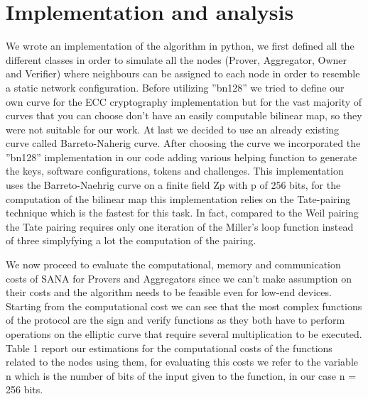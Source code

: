 \documentclass[10pt, a4paper, twocolumn]{article} %
\begin{document}
\section{Implementation and analysis}

We wrote an implementation of the algorithm in python, we first defined all the different classes in order to simulate all the nodes (Prover, Aggregator, Owner and Verifier) where neighbours can be assigned to each node in order to resemble a static network configuration.
Before utilizing ''bn128'' we tried to define our own curve for the ECC cryptography implementation but for the vast majority of curves that you can choose don't have an easily computable bilinear map, so they were not suitable for our work. At last we decided to use an already existing curve called Barreto-Naherig curve.
After choosing the curve we incorporated the ''bn128'' implementation in our code adding various helping function to generate the keys, software configurations, tokens and challenges.
This implementation uses the Barreto-Naehrig curve on a finite field Zp with p of 256 bits, for the computation of the bilinear map this implementation relies on the Tate-pairing technique which is the fastest for this task. In fact, compared to the Weil pairing the Tate pairing requires only one iteration of the Miller's loop function instead of three simplyfying a lot the computation of the pairing.

We now proceed to evaluate the computational, memory and communication costs of SANA for Provers and Aggregators since we can't make assumption on their costs and the algorithm needs to be feasible even for low-end devices.
Starting from the computational cost we can see that the most complex functions of the protocol are the sign and verify functions as they both have to perform operations on the elliptic curve that require several multiplication to be executed.
Table 1 report our estimations for the computational costs of the functions related to the nodes using them, for evaluating this costs we refer to the variable n which is the number of bits of the input given to the function, in our case n = 256 bits.
\end{document}
